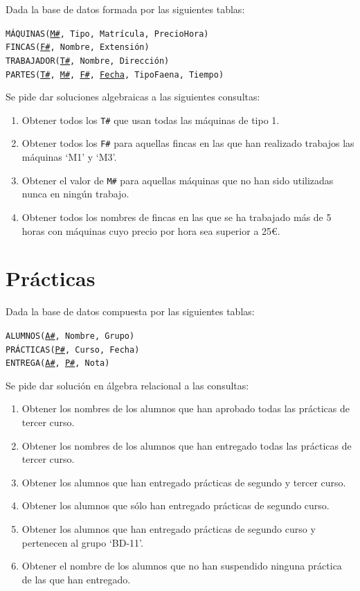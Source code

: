 \documentclass[a4paper]{article}
\begin{document}
Dada la base de datos formada por las siguientes tablas:

\begin{addmargin}[1.5em]{0em}
    \texttt{MÁQUINAS(\underline{M\#}, Tipo, Matrícula, PrecioHora)}\\
    \texttt{FINCAS(\underline{F\#}, Nombre, Extensión)}\\
    \texttt{TRABAJADOR(\underline{T\#}, Nombre, Dirección)}\\
    \texttt{PARTES(\underline{T\#}, \underline{M\#}, \underline{F\#}, \underline{Fecha}, TipoFaena, Tiempo)}
\end{addmargin}

Se pide dar soluciones algebraicas a las siguientes consultas:

\begin{enumerate}
    \item Obtener todos los \texttt{T\#} que usan todas las máquinas de tipo 1.
    \item Obtener todos los \texttt{F\#} para aquellas fincas en las que han realizado trabajos las máquinas `M1' y `M3'.
    \item Obtener el valor de \texttt{M\#} para aquellas máquinas que no han sido utilizadas nunca en ningún trabajo.
    \item Obtener todos los nombres de fincas en las que se ha trabajado más de 5 horas con máquinas cuyo precio por hora sea superior a 25€.
\end{enumerate}

\section{Prácticas}

Dada la base de datos compuesta por las siguientes tablas:

\begin{addmargin}[1.5em]{0em}
    \texttt{ALUMNOS(\underline{A\#}, Nombre, Grupo)}\\
    \texttt{PRÁCTICAS(\underline{P\#}, Curso, Fecha)}\\
    \texttt{ENTREGA(\underline{A\#}, \underline{P\#}, Nota)}
\end{addmargin}

Se pide dar solución en álgebra relacional a las consultas:

\begin{enumerate}
    \item Obtener los nombres de los alumnos que han aprobado todas las prácticas de tercer curso.
    \item Obtener los nombres de los alumnos que han entregado todas las prácticas de tercer curso.
    \item Obtener los alumnos que han entregado prácticas de segundo y tercer curso.
    \item Obtener los alumnos que sólo han entregado prácticas de segundo curso.
    \item Obtener los alumnos que han entregado prácticas de segundo curso y pertenecen al grupo `BD-11'.
    \item Obtener el nombre de los alumnos que no han suspendido ninguna práctica de las que han entregado.
\end{enumerate}
\end{document}
